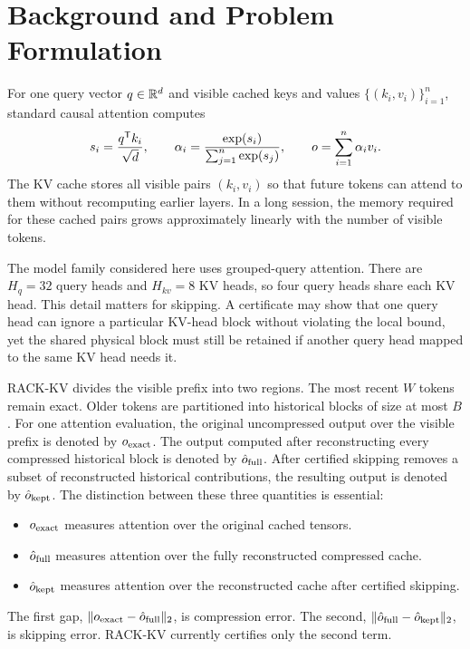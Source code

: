 \section{Background and Problem Formulation}

For one query vector \(q \in \mathbb{R}^d\) and visible cached keys and values \(\{(k_i,v_i)\}_{i=1}^n\), standard causal attention computes
\begin{equation}
  s_i = \frac{q^{\mathsf{T}} k_i}{\sqrt{d}}, \qquad
  \alpha_i = \frac{\operatorname{exp}(s_i)}{\sum_{j=1}^n \operatorname{exp}(s_j)}, \qquad
  o = \sum_{i=1}^n \alpha_i v_i.
\end{equation}
The KV cache stores all visible pairs \((k_i,v_i)\) so that future tokens can attend to them without recomputing earlier layers. In a long session, the memory required for these cached pairs grows approximately linearly with the number of visible tokens.

The model family considered here uses grouped-query attention. There are \(H_q=32\) query heads and \(H_{kv}=8\) KV heads, so four query heads share each KV head. This detail matters for skipping. A certificate may show that one query head can ignore a particular KV-head block without violating the local bound, yet the shared physical block must still be retained if another query head mapped to the same KV head needs it.

RACK-KV divides the visible prefix into two regions. The most recent \(W\) tokens remain exact. Older tokens are partitioned into historical blocks of size at most \(B\). For one attention evaluation, the original uncompressed output over the visible prefix is denoted by \(o_{\mathrm{exact}}\). The output computed after reconstructing every compressed historical block is denoted by \(\hat{o}_{\mathrm{full}}\). After certified skipping removes a subset of reconstructed historical contributions, the resulting output is denoted by \(\hat{o}_{\mathrm{kept}}\). The distinction between these three quantities is essential:
\begin{itemize}[leftmargin=1.5em]
  \item \(o_{\mathrm{exact}}\) measures attention over the original cached tensors.
  \item \(\hat{o}_{\mathrm{full}}\) measures attention over the fully reconstructed compressed cache.
  \item \(\hat{o}_{\mathrm{kept}}\) measures attention over the reconstructed cache after certified skipping.
\end{itemize}

The first gap, \(\lVert o_{\mathrm{exact}}-\hat{o}_{\mathrm{full}} \rVert_2\), is compression error. The second, \(\lVert \hat{o}_{\mathrm{full}}-\hat{o}_{\mathrm{kept}} \rVert_2\), is skipping error. RACK-KV currently certifies only the second term.

